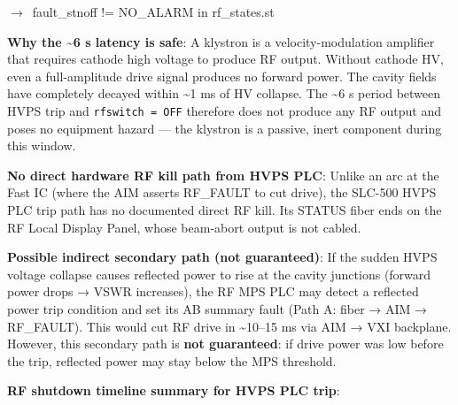 \begin{timeline}
{      $\rightarrow$~fault\_stnoff != NO\_ALARM in rf\_states.st}
\end{timeline}

\textbf{Why the \textasciitilde6 s latency is safe}: A klystron is a velocity-modulation amplifier that requires cathode high voltage to produce RF output. Without cathode HV, even a full-amplitude drive signal produces no forward power. The cavity fields have completely decayed within \textasciitilde1 ms of HV collapse. The \textasciitilde6 s period between HVPS trip and \texttt{rfswitch\ =\ OFF} therefore does not produce any RF output and poses no equipment hazard --- the klystron is a passive, inert component during this window.

\textbf{No direct hardware RF kill path from HVPS PLC}: Unlike an arc at the Fast IC (where the AIM asserts RF\_FAULT to cut drive), the SLC-500 HVPS PLC trip path has no documented direct RF kill. Its STATUS fiber ends on the RF Local Display Panel, whose beam-abort output is not cabled.

\textbf{Possible indirect secondary path (not guaranteed)}: If the sudden HVPS voltage collapse causes reflected power to rise at the cavity junctions (forward power drops → VSWR increases), the RF MPS PLC may detect a reflected power trip condition and set its AB summary fault (Path A: fiber → AIM → RF\_FAULT). This would cut RF drive in \textasciitilde10--15 ms via AIM → VXI backplane. However, this secondary path is \textbf{not guaranteed}: if drive power was low before the trip, reflected power may stay below the MPS threshold.

\textbf{RF shutdown timeline summary for HVPS PLC trip}:

